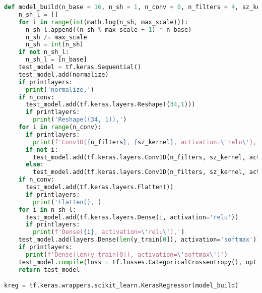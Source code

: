 \documentclass[12pt,letterpaper,oneside,reqno]{book}
\theoremstyle{plain}
\theoremstyle{definition}
\theoremstyle{plain}
\theoremstyle{remark}
\theoremstyle{plain}
\theoremstyle{definition}
\theoremstyle{plain}
\begin{document}
\begin{lstlisting}[language=Python, caption={NAS Model Construction Code}, label=lst:nas_model_build, frame=single]
def model_build(n_base = 16, n_sh = 1, n_conv = 0, n_filters = 4, sz_kernel = 2, max_scale = 4, printlayers = False):
    n_sh_l = []
    for i in range(int(math.log(n_sh, max_scale))):
      n_sh_l.append((n_sh % max_scale + 1) * n_base)
      n_sh /= max_scale
      n_sh = int(n_sh)
    if not n_sh_l:
      n_sh_l = [n_base]
    test_model = tf.keras.Sequential()
    test_model.add(normalize)
    if printlayers:
      print('normalize,')
    if n_conv:
      test_model.add(tf.keras.layers.Reshape((34,1)))
      if printlayers:
        print('Reshape((34, 1)),')
    for i in range(n_conv):
      if printlayers:
        print(f'Conv1D({n_filters}, {sz_kernel}, activation=\'relu\'),')
      if not i:
        test_model.add(tf.keras.layers.Conv1D(n_filters, sz_kernel, activation='relu', input_shape=(34, 1)))
      else:
        test_model.add(tf.keras.layers.Conv1D(n_filters, sz_kernel, activation='relu'))
    if n_conv:
      test_model.add(tf.keras.layers.Flatten())
      if printlayers:
        print('Flatten(),')
    for i in n_sh_l:
      test_model.add(tf.keras.layers.Dense(i, activation='relu'))
      if printlayers:
        print(f'Dense({i}, activation=\'relu\'),')
    test_model.add(layers.Dense(len(y_train[0]), activation='softmax'))
    if printlayers:
      print(f'Dense(len(y_train[0]), activation=\'softmax\')')
    test_model.compile(loss = tf.losses.CategoricalCrossentropy(), optimizer=tf.optimizers.Adam(), metrics=['categorical_accuracy'])
    return test_model

kreg = tf.keras.wrappers.scikit_learn.KerasRegressor(model_build)
\end{lstlisting}
\end{document}
